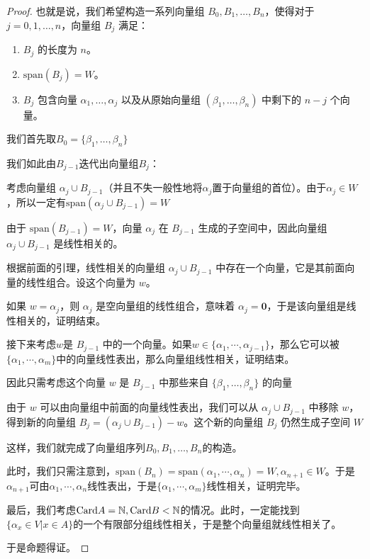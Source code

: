 \documentclass[12pt, a4paper, oneside, UTF8]{ctexbook}
\begin{document}
\begin{para}{0}
\begin{proof}
						也就是说，我们希望构造一系列向量组 $B_0, B_1, \dots, B_n$，使得对于 $j=0, 1, \dots, n$，向量组 $B_j$ 满足：
						\begin{enumerate}
							\item $B_j$ 的长度为 $n$。
							\item $\text{span}(B_j) = W$。
							\item $B_j$ 包含向量 $\alpha _1, \dots, \alpha _j$ 以及从原始向量组 $(\beta _1, \dots, \beta _n)$ 中剩下的 $n-j$ 个向量。
						\end{enumerate}
						
						我们首先取$B_0 = \{\beta _1, \dots, \beta _n\}$

						我们如此由$B_{j-1}$迭代出向量组$B_j$：

						考虑向量组 $\alpha_j \cup B_{j-1}$（并且不失一般性地将$\alpha_j$置于向量组的首位）。由于$\alpha_j \in W$，所以一定有$\text{span}(\alpha_j \cup B_{j-1})=W$
						
						由于 $\text{span}(B_{j-1})=W$，向量 $\alpha _j$ 在 $B_{j-1}$ 生成的子空间中，因此向量组 $\alpha _j\cup B_{j-1}$ 是线性相关的。

						根据前面的引理，线性相关的向量组 $\alpha_j\cup B_{j-1}$ 中存在一个向量，它是其前面向量的线性组合。设这个向量为 $w$。
						
						如果 $w = \alpha_j$，则 $\alpha_j$ 是空向量组的线性组合，意味着 $\alpha_j = \mathbf{0}$，于是该向量组是线性相关的，证明结束。

						接下来考虑$w$是 $B_{j-1}$ 中的一个向量。如果$w \in \{\alpha_1,\cdots,\alpha_{j-1}\}$，那么它可以被$\{\alpha_1,\cdots,\alpha_m\}$中的向量线性表出，那么向量组线性相关，证明结束。

						因此只需考虑这个向量 $w$ 是 $B_{j-1}$ 中那些来自 $\{\beta _1, \dots, \beta _n\}$ 的向量

						由于 $w$ 可以由向量组中前面的向量线性表出，我们可以从 $\alpha_j \cup B_{j-1}$ 中移除 $w$，得到新的向量组 $B_j = (\alpha_j \cup B_{j-1})-w$。这个新的向量组 $B_j$ 仍然生成子空间 $W$
						
						这样，我们就完成了向量组序列$B_0, B_1, \dots, B_n$的构造。
						
						此时，我们只需注意到，$\text{span}(B_n)=\text{span}(\alpha_1,\cdots,\alpha _n)=W,\alpha_{n+1} \in W$。于是$\alpha_{n+1}$可由$\alpha_1,\cdots,\alpha_n$线性表出，于是$\{\alpha_1,\cdots,\alpha_m\}$线性相关，证明完毕。

						最后，我们考虑$\text{Card} A = \mathbb{N},\text{Card} B < \mathbb{N}$的情况。此时，一定能找到$\{\alpha_x \in V | x \in A\}$的一个有限部分组线性相关，于是整个向量组就线性相关了。

						于是命题得证。
					\end{proof}
			\end{para}
\end{document}
